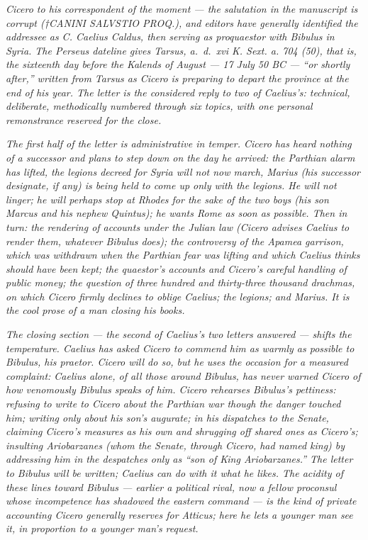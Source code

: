 
\textit{Cicero to his correspondent of the moment ---
the salutation in the manuscript is corrupt
(\textit{†CANINI SALVSTIO PROQ.}), and editors have
generally identified the addressee as C. Caelius
Caldus, then serving as proquaestor with Bibulus in
Syria. The Perseus dateline gives Tarsus,
\textit{a.\ d.\ xvi K. Sext. a. 704 (50)}, that is, the
sixteenth day before the Kalends of August --- 17 July
50 BC --- ``or shortly after,'' written from Tarsus as
Cicero is preparing to depart the province at the end
of his year. The letter is the considered reply to two
of Caelius's: technical, deliberate, methodically
numbered through six topics, with one personal
remonstrance reserved for the close.}

\textit{The first half of the letter is administrative
in temper. Cicero has heard nothing of a successor and
plans to step down on the day he arrived: the Parthian
alarm has lifted, the legions decreed for Syria will
not now march, Marius (his successor designate, if any)
is being held to come up only with the legions. He will
not linger; he will perhaps stop at Rhodes for the sake
of the two boys (his son Marcus and his nephew
Quintus); he wants Rome as soon as possible. Then in
turn: the rendering of accounts under the Julian law
(Cicero advises Caelius to render them, whatever
Bibulus does); the controversy of the Apamea garrison,
which was withdrawn when the Parthian fear was lifting
and which Caelius thinks should have been kept; the
quaestor's accounts and Cicero's careful handling of
public money; the question of three hundred and
thirty-three thousand drachmas, on which Cicero firmly
declines to oblige Caelius; the legions; and Marius. It
is the cool prose of a man closing his books.}

\textit{The closing section --- the second of Caelius's
two letters answered --- shifts the temperature. Caelius
has asked Cicero to commend him as warmly as possible
to Bibulus, his praetor. Cicero will do so, but he uses
the occasion for a measured complaint: Caelius alone,
of all those around Bibulus, has never warned Cicero of
how venomously Bibulus speaks of him. Cicero rehearses
Bibulus's pettiness: refusing to write to Cicero about
the Parthian war though the danger touched him; writing
only about his son's augurate; in his dispatches to the
Senate, claiming Cicero's measures as his own and
shrugging off shared ones as Cicero's; insulting
Ariobarzanes (whom the Senate, through Cicero, had
named king) by addressing him in the despatches only as
``son of King Ariobarzanes.'' The letter to Bibulus
will be written; Caelius can do with it what he likes.
The acidity of these lines toward Bibulus --- earlier a
political rival, now a fellow proconsul whose
incompetence has shadowed the eastern command --- is
the kind of private accounting Cicero generally
reserves for Atticus; here he lets a younger man see
it, in proportion to a younger man's request.}

